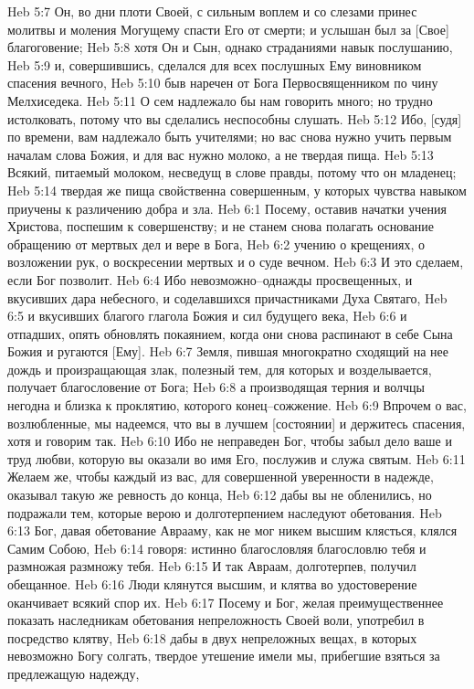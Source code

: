 Heb 5:7  Он, во дни плоти Своей, с сильным воплем и со слезами принес молитвы и моления Могущему спасти Его от смерти; и услышан был за [Свое] благоговение;
Heb 5:8  хотя Он и Сын, однако страданиями навык послушанию,
Heb 5:9  и, совершившись, сделался для всех послушных Ему виновником спасения вечного,
Heb 5:10  быв наречен от Бога Первосвященником по чину Мелхиседека.
Heb 5:11  О сем надлежало бы нам говорить много; но трудно истолковать, потому что вы сделались неспособны слушать.
Heb 5:12  Ибо, [судя] по времени, вам надлежало быть учителями; но вас снова нужно учить первым началам слова Божия, и для вас нужно молоко, а не твердая пища.
Heb 5:13  Всякий, питаемый молоком, несведущ в слове правды, потому что он младенец;
Heb 5:14  твердая же пища свойственна совершенным, у которых чувства навыком приучены к различению добра и зла.
Heb 6:1  Посему, оставив начатки учения Христова, поспешим к совершенству; и не станем снова полагать основание обращению от мертвых дел и вере в Бога,
Heb 6:2  учению о крещениях, о возложении рук, о воскресении мертвых и о суде вечном.
Heb 6:3  И это сделаем, если Бог позволит.
Heb 6:4  Ибо невозможно--однажды просвещенных, и вкусивших дара небесного, и соделавшихся причастниками Духа Святаго,
Heb 6:5  и вкусивших благого глагола Божия и сил будущего века,
Heb 6:6  и отпадших, опять обновлять покаянием, когда они снова распинают в себе Сына Божия и ругаются [Ему].
Heb 6:7  Земля, пившая многократно сходящий на нее дождь и произращающая злак, полезный тем, для которых и возделывается, получает благословение от Бога;
Heb 6:8  а производящая терния и волчцы негодна и близка к проклятию, которого конец--сожжение.
Heb 6:9  Впрочем о вас, возлюбленные, мы надеемся, что вы в лучшем [состоянии] и держитесь спасения, хотя и говорим так.
Heb 6:10  Ибо не неправеден Бог, чтобы забыл дело ваше и труд любви, которую вы оказали во имя Его, послужив и служа святым.
Heb 6:11  Желаем же, чтобы каждый из вас, для совершенной уверенности в надежде, оказывал такую же ревность до конца,
Heb 6:12  дабы вы не обленились, но подражали тем, которые верою и долготерпением наследуют обетования.
Heb 6:13  Бог, давая обетование Аврааму, как не мог никем высшим клясться, клялся Самим Собою,
Heb 6:14  говоря: истинно благословляя благословлю тебя и размножая размножу тебя.
Heb 6:15  И так Авраам, долготерпев, получил обещанное.
Heb 6:16  Люди клянутся высшим, и клятва во удостоверение оканчивает всякий спор их.
Heb 6:17  Посему и Бог, желая преимущественнее показать наследникам обетования непреложность Своей воли, употребил в посредство клятву,
Heb 6:18  дабы в двух непреложных вещах, в которых невозможно Богу солгать, твердое утешение имели мы, прибегшие взяться за предлежащую надежду,
